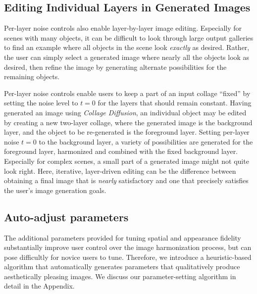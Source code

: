 \vspace{-0.5em}
\subsection{Editing Individual Layers in Generated Images}
\label{method:sequentialGeneration}
\vspace{-0.5em}

Per-layer noise controls also enable layer-by-layer image editing. 
Especially for scenes with many objects, it can be difficult to look through large output galleries to find an example where all objects in the scene look \emph{exactly} as desired.
Rather, the user can simply select a generated image where nearly all the objects look as desired, then refine the image by generating alternate possibilities for the remaining objects. 

Per-layer noise controls enable users to keep a part of an input collage ``fixed'' by setting the noise level to $t=0$ for the layers that should remain constant. 
Having generated an image using \textit{Collage Diffusion}, an individual object may be edited by creating a new two-layer collage, where the generated image is the background layer, and the object to be re-generated is the foreground layer. Setting per-layer noise $t=0$ to the background layer, a variety of possibilities are generated for the foreground layer, harmonized and combined with the fixed background layer. 
Especially for complex scenes, a small part of a generated image might not quite look right.
Here, iterative, layer-driven editing can be the difference between obtaining a final image that is \emph{nearly} satisfactory and one that precisely satisfies the user's image generation goals.   

\vspace{-0.5em}
\subsection{Auto-adjust parameters}
\label{method:parameters} 
\vspace{-0.5em}

The additional parameters provided for tuning spatial and appearance fidelity substantially improve user control over the image harmonization process, but can pose difficultly for novice users to tune. 
Therefore, we introduce a heuristic-based algorithm that automatically generates parameters that qualitatively produce aesthetically pleasing images.
We discuss our parameter-setting algorithm in detail in the Appendix. 